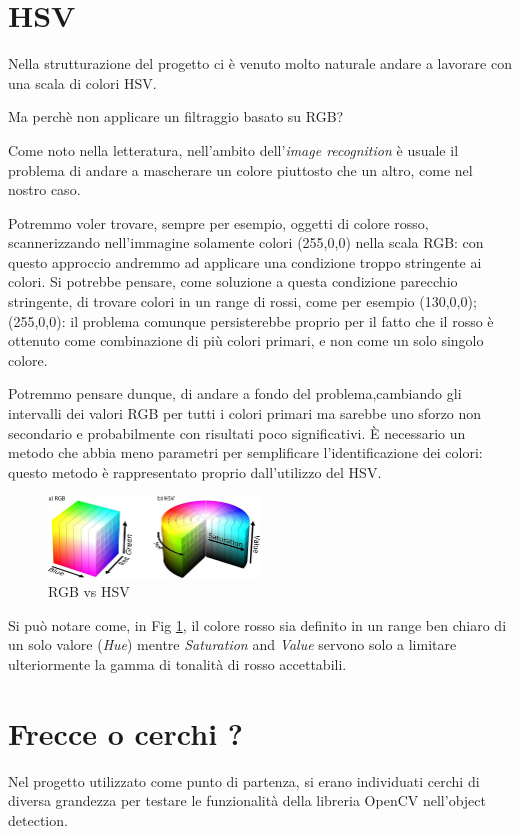 \section{HSV}
Nella strutturazione del progetto ci è venuto molto naturale andare a lavorare con una scala di colori HSV.

Ma perchè non applicare un filtraggio basato su RGB?

Come noto nella letteratura, nell'ambito dell'\textit{image recognition} è usuale il problema di andare a mascherare un colore piuttosto che un altro, come nel nostro caso.

Potremmo voler trovare, sempre per esempio, oggetti di colore rosso, scannerizzando nell'immagine solamente colori (255,0,0) nella scala RGB: con questo approccio andremmo ad applicare una condizione troppo stringente ai colori.
Si potrebbe pensare, come soluzione a questa condizione parecchio stringente, di trovare colori in un range di rossi, come per esempio {(130,0,0);(255,0,0)}: il problema comunque persisterebbe proprio per il fatto che il rosso è ottenuto come combinazione di più colori primari, e non come un solo singolo colore.

Potremmo pensare dunque, di andare a fondo del problema,cambiando gli intervalli dei valori RGB per tutti i colori primari ma sarebbe uno sforzo non secondario e probabilmente con risultati poco significativi.
È necessario un metodo che abbia meno parametri per semplificare l'identificazione dei colori: questo metodo è rappresentato proprio dall'utilizzo del HSV.

\begin{figure}[H]
	\centering
	\includegraphics[width=0.5\textwidth]{Immagini/HSV_RGB.jpeg}
	\caption{RGB vs HSV}
	\label{fig:RGB_&_HSV}
\end{figure}

Si può notare come, in Fig \ref{fig:RGB_&_HSV}, il colore rosso sia definito in un range ben chiaro di un solo valore (\textit{Hue}) mentre \textit{Saturation }and \textit{Value} servono solo a limitare ulteriormente la gamma di tonalità di rosso accettabili. 

\section{Frecce o cerchi ?}
Nel progetto utilizzato come punto di partenza, si erano individuati cerchi di diversa grandezza per testare le funzionalità della libreria OpenCV nell'object detection.

